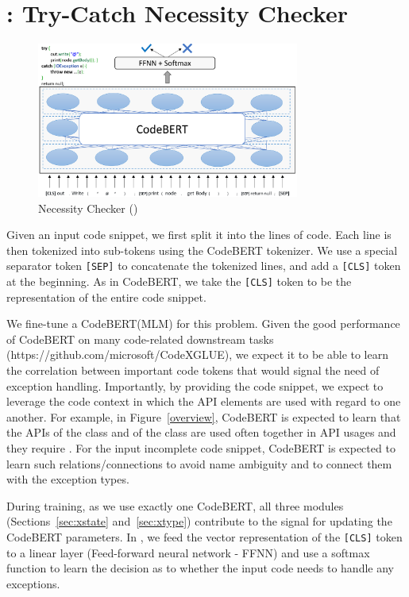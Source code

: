 \section{{\xblock}: Try-Catch Necessity Checker}
\label{xblock:sec}

\begin{figure}[t]
 	\centering
 	\includegraphics[width=3.4in]{xblock-3.png}
        \vspace{-20pt}
 	\caption{ Necessity Checker ({\xblock})}
 	\label{fig:xblock}	
\end{figure}

Given an input code snippet, we first split it into the lines of
code. Each line is then tokenized into sub-tokens using the CodeBERT
tokenizer. We use a special separator token \texttt{[SEP]} to
concatenate the tokenized lines, and add a \texttt{[CLS]} token at the
beginning. As in CodeBERT, we take the \texttt{[CLS]} token to be the
representation of the entire code snippet.

We fine-tune a CodeBERT(MLM) for this problem.  Given the good
performance of CodeBERT on many code-related downstream tasks
(https://github.com/microsoft/CodeXGLUE), we expect it to be able to
learn the correlation between important code tokens that would signal
the need of exception handling. Importantly, by providing the code
snippet, we expect to leverage the code context in which the API
elements are used with regard to one another. For example, in
Figure~\ref{overview}, CodeBERT is expected to learn that the APIs
 of the class  and 
of the class  are used often together in API
usages and they require . For the input incomplete
code snippet, CodeBERT is expected to learn such relations/connections
to avoid name ambiguity and to connect them with the exception types.


During training, as we use exactly one CodeBERT, all three modules
(Sections~\ref{sec:xstate} and~\ref{sec:xtype}) contribute
to the signal for updating the CodeBERT parameters. In {\xblock}, we
feed the vector representation of the \texttt{[CLS]} token to a linear
layer (Feed-forward neural network - FFNN) and use a softmax function
to learn the decision as to whether the input code needs to handle any
exceptions.

